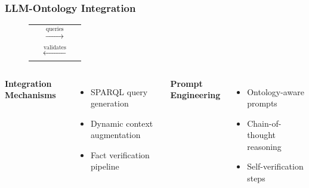 \documentclass{beamer}
\begin{document}
\begin{frame}
\frametitle{LLM-Ontology Integration}

\begin{figure}
\centering
\begin{tabular}{ccc}
\fbox{\begin{minipage}{2.5cm}\centering\textbf{LLM}\end{minipage}} & 
$\xrightarrow{\text{queries}}$ & 
\fbox{\begin{minipage}{2.5cm}\centering\textbf{Ontology}\end{minipage}} \\
 & $\xleftarrow{\text{validates}}$ & 
\end{tabular}
\end{figure}

\begin{columns}

\textbf{Integration Mechanisms}
\begin{itemize}
    \item SPARQL query generation
    \item Dynamic context augmentation
    \item Fact verification pipeline
\end{itemize}

\textbf{Prompt Engineering}
\begin{itemize}
    \item Ontology-aware prompts
    \item Chain-of-thought reasoning
    \item Self-verification steps
\end{itemize}

\end{columns}
\end{frame}
\end{document}

